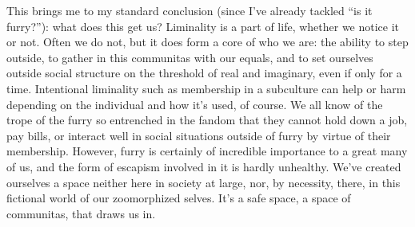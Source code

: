 This brings me to my standard conclusion (since I've already tackled
``is it furry?''): what does this get us? Liminality is a part of life,
whether we notice it or not. Often we do not, but it does form a core of
who we are: the ability to step outside, to gather in this communitas
with our equals, and to set ourselves outside social structure on the
threshold of real and imaginary, even if only for a time. Intentional
liminality such as membership in a subculture can help or harm depending
on the individual and how it's used, of course. We all know of the trope
of the furry so entrenched in the fandom that they cannot hold down a
job, pay bills, or interact well in social situations outside of furry
by virtue of their membership. However, furry is certainly of incredible
importance to a great many of us, and the form of escapism involved in
it is hardly unhealthy. We've created ourselves a space neither here in
society at large, nor, by necessity, there, in this fictional world of
our zoomorphized selves. It's a safe space, a space of communitas, that
draws us in.
